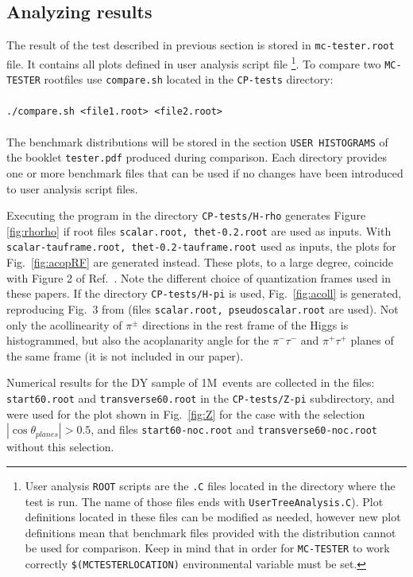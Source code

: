 \documentclass[12pt]{article}
\begin{document}
\subsection{Analyzing results}

The result of the test described in previous section is stored in {\tt mc-tester.root} file.
It contains all plots defined in user analysis script file%
\footnote{User analysis {\tt ROOT} scripts are the {\tt .C} files located
in the directory where the test is run. The name of those files ends with
{\tt *UserTreeAnalysis.C}). Plot definitions located in these files
can be modified as needed, however new plot definitions mean that
benchmark files provided with the distribution cannot be used for comparison.
Keep in mind that in order for {\tt MC-TESTER} to work correctly {\tt \$(MCTESTERLOCATION)} environmental
variable must be set.}.
To compare two {\tt MC-TESTER} rootfiles use {\tt compare.sh}  located in the {\tt CP-tests} directory: \\
\\
{\tt ./compare.sh <file1.root> <file2.root>} \\
\\
The benchmark distributions will be stored in the  section {\tt USER HISTOGRAMS}
of the booklet {\tt tester.pdf} produced during comparison.
Each directory provides one or more benchmark files that can be used if
no changes have been introduced to user analysis script files.

Executing the program in the directory {\tt CP-tests/H-rho} generates Figure \ref{fig:rhorho} 
if root files {\tt scalar.root, thet-0.2.root} are used as inputs.
With {\tt scalar-tauframe.root, thet-0.2-tauframe.root} used as inputs, the plots for Fig.~\ref{fig:acopRF} are generated instead.
These plots, to a large degree, coincide with  Figure 2 of Ref.~\cite{Desch:2003rw}.
Note the different choice of quantization frames used in these papers. 
If the directory {\tt CP-tests/H-pi} is used, Fig.~\ref{fig:acoll} is generated,
reproducing  Fig.~3 from \cite{Kramer:1994jn} (files {\tt scalar.root, pseudoscalar.root} are  used). 
Not only the acollinearity
of $\pi^\pm$ directions in the rest frame of the Higgs is histogrammed, but also the  
acoplanarity angle for the $\pi^- \tau^-$ and $\pi^+ \tau^+$ planes
of the same frame  (it is not included in our paper).

Numerical results for the DY sample of 1M~events are collected  in the files:
{\tt start60.root} and {\tt transverse60.root} in the {\tt CP-tests/Z-pi} subdirectory,
and were used for the plot shown in Fig.~\ref{fig:Z} for the case with  
the selection $|\cos \theta_{planes}|> 0.5$,
and files {\tt start60-noc.root} and {\tt transverse60-noc.root} without this selection.
\end{document}

